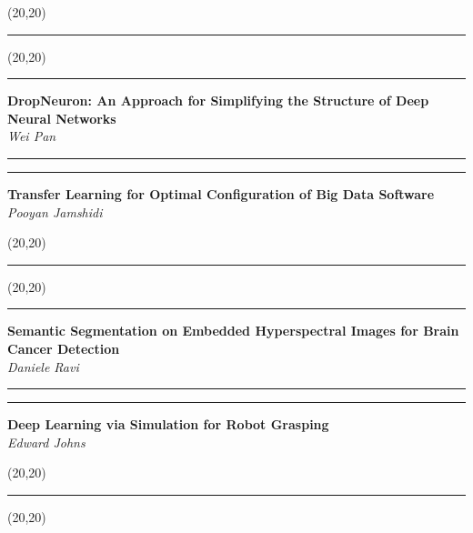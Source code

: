\documentclass[11pt]{article}
\newcommand{\talk}[1]{\Large\flushleft\textbf{#1}\\}
\newcommand{\speaker}[1]{\textit{#1}\\}
\newcommand{\separator}{\noindent\rule{\linewidth}{0.1mm}}
\newcommand{\votebox}{\noindent\hfill\framebox(20,20){}}
\newcommand{\hstrut}{\noindent\rule{\linewidth}{0pt}}
\begin{document}
\vfill
\noindent
\begin{minipage}[b]{0.49\linewidth}
\votebox%
\end{minipage}
\begin{minipage}[b]{0.02\linewidth}
\hstrut%
\end{minipage}
\begin{minipage}[b]{0.49\linewidth}
\votebox%
\end{minipage}
\noindent
\begin{minipage}[t]{0.49\linewidth}
\separator%
\talk{DropNeuron: An Approach for Simplifying the Structure of Deep Neural
      Networks}
\speaker{Wei Pan}
\end{minipage}
\begin{minipage}[t]{0.02\linewidth}
\hstrut%
\end{minipage}
\begin{minipage}[t]{0.49\linewidth}
\separator%
\talk{Transfer Learning for Optimal Configuration of Big Data Software}
\speaker{Pooyan Jamshidi}
\end{minipage}
\vfill
\noindent
\begin{minipage}[b]{0.49\linewidth}
\votebox%
\end{minipage}
\begin{minipage}[b]{0.02\linewidth}
\hstrut%
\end{minipage}
\begin{minipage}[b]{0.49\linewidth}
\votebox%
\end{minipage}
\noindent
\begin{minipage}[t]{0.49\linewidth}
\separator%
\talk{Semantic Segmentation on Embedded Hyperspectral Images for Brain Cancer
      Detection}
\speaker{Daniele Ravi}
\end{minipage}
\begin{minipage}[t]{0.02\linewidth}
\hstrut%
\end{minipage}
\begin{minipage}[t]{0.49\linewidth}
\separator%
\talk{Deep Learning via Simulation for Robot Grasping}
\speaker{Edward Johns}
\end{minipage}
\vfill
\noindent
\begin{minipage}[b]{0.49\linewidth}
\votebox%
\end{minipage}
\begin{minipage}[b]{0.02\linewidth}
\hstrut%
\end{minipage}
\begin{minipage}[b]{0.49\linewidth}
\votebox%
\end{minipage}
\end{document}
